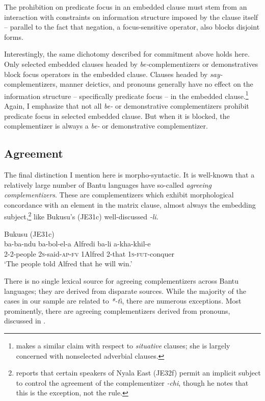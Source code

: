 \documentclass[output=paper,colorlinks,citecolor=brown,
]{langscibook}
\begin{document}
The prohibition on predicate focus in an embedded clause must stem from an interaction with constraints on information structure imposed by the clause itself -- parallel to the fact that negation, a focus-sensitive operator, also blocks disjoint forms. 

Interestingly, the same dichotomy described for commitment above holds here. Only selected embedded clauses headed by \textit{be-}complementizers or demonstratives block focus operators in the embedded clause. Clauses  headed by \textit{say-}complementizers, manner deictics, and pronouns generally have no effect on the information structure -- specifically predicate focus -- in the embedded clause.\footnote{\citet{VanderWal:2014} makes a similar claim with respect to \textit{situative} clauses; she is largely concerned with nonselected adverbial clauses.}  Again, I emphasize that not all \textit{be-} or demonstrative complementizers prohibit predicate focus in selected embedded clause. But when it is blocked, the complementizer is always a \textit{be-} or demonstrative complementizer. 


\subsection{Agreement}\label{sec:gluckman:agreementsection}

The final distinction I mention here is morpho-syntactic. It is well-known that a relatively large number of Bantu languages have so-called \textit{agreeing complementizers}. These are complementizers which exhibit morphological concordance with an element in the matrix clause, almost always the embedding subject,\footnote{\citet{Gluckman:2023} reports that certain speakers of Nyala East (JE32f) permit an implicit subject to control the agreement of the complementizer \textit{-chi}, though he notes that this is the exception, not the rule.}  like Bukusu's (JE31c) well-discussed \textit{-li}.

\ea Bukusu (JE31c) \citep[358]{Diercks:2013} \\
	\gll ba-ba-ndu ba-bol-el-a Alfredi ba-li a-kha-khil-e\\
	2-2-people 2\textsc{s}-said-\textsc{ap}-\textsc{fv} 1Alfred 2-that 1\textsc{s}-\textsc{fut}-conquer\\
	\glt `The people told Alfred that he will win.' 
\z

There is no single lexical source for agreeing complementizers across Bantu languages;  they are derived from disparate sources. While the majority of the cases in our sample are related to \textit{*-t\`\i}, there are numerous exceptions. Most prominently, there are agreeing complementizers derived from pronouns,  discussed in . 
\end{document}
